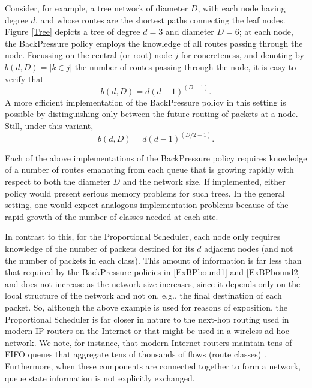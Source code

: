 \documentclass{amsart}
\begin{document}
Consider, for example, a tree network of diameter $D$, with each node having degree $d$, and whose routes are the shortest paths connecting the leaf nodes.  Figure \ref{Tree} depicts a tree of degree $d=3$ and diameter $D=6$; at each node,
the BackPressure policy employs the knowledge of all routes passing through the node.
Focussing on the central (or root) node $j$ for concreteness, and 
denoting by $b(d,D) = |k\in j|$ the number of routes passing through the node,
  it is easy to verify that
\begin{equation}\label{ExBPbound1}
b(d,D)  = d(d-1)^{(D -1)}.
\end{equation}
A more efficient implementation of the BackPressure policy in this setting is possible 
by distinguishing only between the future routing of packets at a node.
Still, under this variant, 
\begin{equation}\label{ExBPbound2}
 b(d,D) = d(d-1)^{({D}/{2}-1)}.
\end{equation}

Each of the above implementations of the BackPressure policy requires
knowledge of a number of routes emanating from each queue that is growing rapidly  with respect to both the
diameter $D$ and the network size.  If implemented,
either policy would present serious memory problems for such trees.
In the general setting, one would expect analogous implementation problems because of the rapid growth of the number of classes needed at each site. 

In contrast to this, for the Proportional Scheduler, each node only requires knowledge of the number of packets destined for its $d$
adjacent nodes (and not the number of packets in each class).
This amount of information is far less than that required by the BackPressure policies  in \eqref{ExBPbound1} and \eqref{ExBPbound2} and 
does not increase as the network size increases, since it
depends only on the local structure of the network and not on, e.g., the
final destination of each packet.
So, although the above example is used for reasons of exposition, 
the Proportional Scheduler is far closer in nature to the next-hop routing used in modern IP routers on the Internet or that might be used in a wireless ad-hoc network. We note, for instance, that modern Internet routers maintain tens of FIFO queues that aggregate tens of thousands of flows (route classes) \cite{mckeown1999islip,appenzeller2004sizing}. Furthermore, when these components are connected together to form a network, queue state information is not explicitly exchanged.
\end{document}
